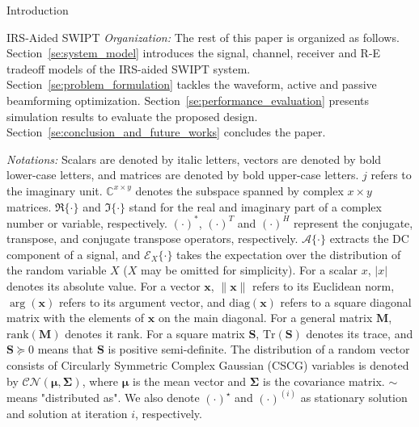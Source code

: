 \documentclass[journal]{IEEEtran}
\begin{document}
\begin{section}{Introduction}
\begin{subsection}{IRS-Aided SWIPT}
			\textit{Organization:} The rest of this paper is organized as follows. Section~\ref{se:system_model} introduces the signal, channel, receiver and R-E tradeoff models of the IRS-aided SWIPT system. Section~\ref{se:problem_formulation} tackles the waveform, active and passive beamforming optimization. Section~\ref{se:performance_evaluation} presents simulation results to evaluate the proposed design. Section~\ref{se:conclusion_and_future_works} concludes the paper.

			\textit{Notations:} Scalars are denoted by italic letters, vectors are denoted by bold lower-case letters, and matrices are denoted by bold upper-case letters. $j$ refers to the imaginary unit. $\mathbb{C}^{x \times y}$ denotes the subspace spanned by complex $x \times y$ matrices. $\Re\{\cdot\}$ and $\Im\{\cdot\}$ stand for the real and imaginary part of a complex number or variable, respectively. $(\cdot)^*$, $(\cdot)^T$ and $(\cdot)^H$ represent the conjugate, transpose, and conjugate transpose operators, respectively. $\mathcal{A}\{\cdot\}$ extracts the DC component of a signal, and $\mathcal{E}_X\{\cdot\}$ takes the expectation over the distribution of the random variable $X$ ($X$ may be omitted for simplicity). For a scalar $x$, $\lvert{x}\rvert$ denotes its absolute value. For a vector $\boldsymbol{x}$, $\lVert{\boldsymbol{x}}\rVert$ refers to its Euclidean norm, $\arg(\boldsymbol{x})$ refers to its argument vector, and $\mathrm{diag}(\boldsymbol{x})$ refers to a square diagonal matrix with the elements of $\boldsymbol{x}$ on the main diagonal. For a general matrix $\boldsymbol{M}$, $\mathrm{rank}(\boldsymbol{M})$ denotes it rank. For a square matrix $\boldsymbol{S}$, $\mathrm{Tr}(\boldsymbol{S})$ denotes its trace, and $\boldsymbol{S} \succeq 0$ means that $\boldsymbol{S}$ is positive semi-definite. The distribution of a random vector consists of Circularly Symmetric Complex Gaussian (CSCG) variables is denoted by $\mathcal{CN}(\boldsymbol{\mu},\boldsymbol{\Sigma})$, where $\boldsymbol{\mu}$ is the mean vector and $\boldsymbol{\Sigma}$ is the covariance matrix. $\sim$ means "distributed as". We also denote $(\cdot)^{\star}$ and $(\cdot)^{(i)}$ as stationary solution and solution at iteration $i$, respectively.
		\end{subsection}
	\end{section}
\end{document}
